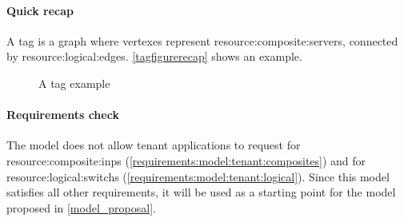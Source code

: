 \paragraph{Quick recap}
A \gls{tag} is a graph where vertexes represent \glspl{resource:composite:server}, connected by \glspl{resource:logical:edge}.
\autoref{tagfigurerecap} shows an example.

\begin{figure}[!htb]
    \centering
    \usebox{\tagfigure}
    \caption{A \gls{tag} example}
    \label{tagfigurerecap}
\end{figure}

\paragraph{Requirements check}
The model does not allow tenant applications to request for \glspl{resource:composite:inp} (\xmark \ref{requirements:model:tenant:composites}) and for \glspl{resource:logical:switch} (\xmark \ref{requirements:model:tenant:logical}).
Since this model satisfies all other requirements, it will be used as a starting point for the \gls{model} proposed in \autoref{model_proposal}.